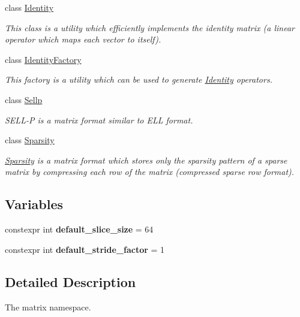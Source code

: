 \begin{DoxyCompactItemize}
class \hyperlink{classgko_1_1matrix_1_1Identity}{Identity}
\begin{DoxyCompactList}\small\item\em This class is a utility which efficiently implements the identity matrix (a linear operator which maps each vector to itself). \end{DoxyCompactList}\item 
class \hyperlink{classgko_1_1matrix_1_1IdentityFactory}{Identity\+Factory}
\begin{DoxyCompactList}\small\item\em This factory is a utility which can be used to generate \hyperlink{classgko_1_1matrix_1_1Identity}{Identity} operators. \end{DoxyCompactList}\item 
class \hyperlink{classgko_1_1matrix_1_1Sellp}{Sellp}
\begin{DoxyCompactList}\small\item\em S\+E\+L\+L-\/P is a matrix format similar to E\+LL format. \end{DoxyCompactList}\item 
class \hyperlink{classgko_1_1matrix_1_1Sparsity}{Sparsity}
\begin{DoxyCompactList}\small\item\em \hyperlink{classgko_1_1matrix_1_1Sparsity}{Sparsity} is a matrix format which stores only the sparsity pattern of a sparse matrix by compressing each row of the matrix (compressed sparse row format). \end{DoxyCompactList}\end{DoxyCompactItemize}
\subsection*{Variables}
\begin{DoxyCompactItemize}
\item 
\mbox{\label{namespacegko_1_1matrix_a80dd7829c1ed8b1bed2e182f4a9c5634}} 
constexpr int {\bfseries default\+\_\+slice\+\_\+size} = 64
\item 
\mbox{\label{namespacegko_1_1matrix_a26ccb7bd77d0d18162e18a76d0277a80}} 
constexpr int {\bfseries default\+\_\+stride\+\_\+factor} = 1
\end{DoxyCompactItemize}


\subsection{Detailed Description}
The matrix namespace. 